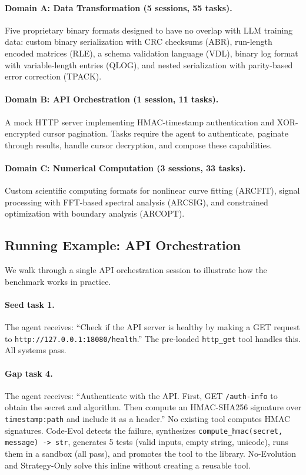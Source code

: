 \documentclass[sigplan,review,anonymous]{acmart}
\begin{document}
\paragraph{Domain A: Data Transformation (5 sessions, 55 tasks).} Five proprietary binary formats designed to have no overlap with LLM training data: custom binary serialization with CRC checksums (ABR), run-length encoded matrices (RLE), a schema validation language (VDL), binary log format with variable-length entries (QLOG), and nested serialization with parity-based error correction (TPACK).

\paragraph{Domain B: API Orchestration (1 session, 11 tasks).} A mock HTTP server implementing HMAC-timestamp authentication and XOR-encrypted cursor pagination. Tasks require the agent to authenticate, paginate through results, handle cursor decryption, and compose these capabilities.

\paragraph{Domain C: Numerical Computation (3 sessions, 33 tasks).} Custom scientific computing formats for nonlinear curve fitting (ARCFIT), signal processing with FFT-based spectral analysis (ARCSIG), and constrained optimization with boundary analysis (ARCOPT).

\subsection{Running Example: API Orchestration}

We walk through a single API orchestration session to illustrate how the benchmark works in practice.

\paragraph{Seed task 1.} The agent receives: ``Check if the API server is healthy by making a GET request to \texttt{http://127.0.0.1:18080/health}.'' The pre-loaded \texttt{http\_get} tool handles this. All systems pass.

\paragraph{Gap task 4.} The agent receives: ``Authenticate with the API. First, GET \texttt{/auth-info} to obtain the secret and algorithm. Then compute an HMAC-SHA256 signature over \texttt{timestamp:path} and include it as a header.'' No existing tool computes HMAC signatures. Code-Evol detects the failure, synthesizes \texttt{compute\_hmac(secret, message) -> str}, generates 5 tests (valid inputs, empty string, unicode), runs them in a sandbox (all pass), and promotes the tool to the library. No-Evolution and Strategy-Only solve this inline without creating a reusable tool.
\end{document}
